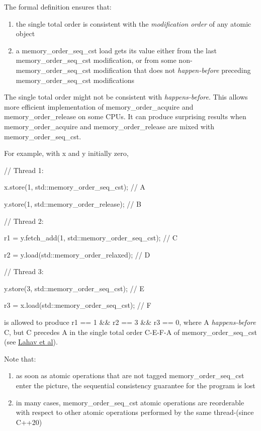 \documentclass[
]{article}
\begin{document}
The formal definition ensures that:

\begin{enumerate}
\def\labelenumi{\arabic{enumi})}
\item
  the single total order is consistent with the \emph{modification
  order} of any atomic object
\item
  a memory\_order\_seq\_cst load gets its value either from the last
  memory\_order\_seq\_cst modification, or from some
  non-memory\_order\_seq\_cst modification that does not
  \emph{happen-before} preceding memory\_order\_seq\_cst modifications
\end{enumerate}

The single total order might not be consistent with
\emph{happens-before}. This allows more efficient implementation of
memory\_order\_acquire and memory\_order\_release on some CPUs. It can
produce surprising results when memory\_order\_acquire and
memory\_order\_release are mixed with memory\_order\_seq\_cst.

For example, with x and y initially zero,

// Thread 1:

x.store(1, std::memory\_order\_seq\_cst); // A

y.store(1, std::memory\_order\_release); // B

// Thread 2:

r1 = y.fetch\_add(1, std::memory\_order\_seq\_cst); // C

r2 = y.load(std::memory\_order\_relaxed); // D

// Thread 3:

y.store(3, std::memory\_order\_seq\_cst); // E

r3 = x.load(std::memory\_order\_seq\_cst); // F

is allowed to produce r1 == 1 \&\& r2 == 3 \&\& r3 == 0, where A
\emph{happens-before} C, but C precedes A in the single total order
C-E-F-A of memory\_order\_seq\_cst (see
\href{https://plv.mpi-sws.org/scfix/paper.pdf}{Lahav et al}).

Note that:

\begin{enumerate}
\def\labelenumi{\arabic{enumi}.}
\item
  as soon as atomic operations that are not tagged
  memory\_order\_seq\_cst enter the picture, the sequential consistency
  guarantee for the program is lost
\item
  in many cases, memory\_order\_seq\_cst atomic operations are
  reorderable with respect to other atomic operations performed by the
  same thread-(since C++20)
\end{enumerate}
\end{document}
